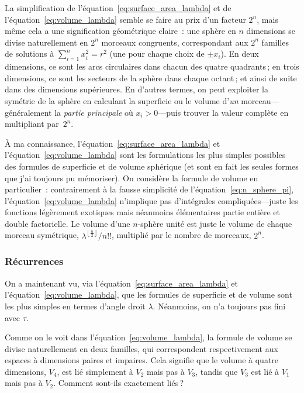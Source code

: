La simplification de l'équation~\eqref{eq:surface_area_lambda} et de l'équation~\eqref{eq:volume_lambda} semble se faire au prix d'un facteur $2^n$, mais même cela a une signification géométrique claire~: une sphère en $n$ dimensions se divise naturellement en $2^n$ morceaux congruents, correspondant aux $2^n$ familles de solutions à $\sum_{i=1}^{n} x_i^2 = r^2$ (une pour chaque choix de $\pm x_i$). En deux dimensions, ce sont les arcs circulaires dans chacun des quatre quadrants\,; en trois dimensions, ce sont les secteurs de la sphère dans chaque octant\,; et ainsi de suite dans des dimensions supérieures. En d'autres termes, on peut exploiter la symétrie de la sphère en calculant la superficie ou le volume d'\emph{un} morceau---généralement la \emph{partie principale} où $x_i > 0$---puis trouver la valeur complète en multipliant par~$2^n$.

À ma connaissance, l'équation~\eqref{eq:surface_area_lambda} et l'équation~\eqref{eq:volume_lambda} sont les formulations les plus simples possibles des formules de superficie et de volume sphérique (et sont en fait les seules formes que j'ai toujours pu mémoriser). On considère la formule de volume en particulier~: contrairement à la fausse simplicité de l'équation~\eqref{eq:n_sphere_pi}, l'équation~\eqref{eq:volume_lambda} n'implique pas d'intégrales compliquées---juste les fonctions légèrement exotiques mais néanmoins élémentaires partie entière et double factorielle. Le volume d'une $n$-sphère unité est juste le volume de chaque morceau symétrique, $\lambda^{\left\lfloor \frac{n}{2} \right\rfloor}/n!!$, multiplié par le nombre de morceaux, $2^n$.


\subsubsection{Récurrences} %
\label{sec:recurrences}

On a maintenant vu, via l'équation~\eqref{eq:surface_area_lambda} et l'équation~\eqref{eq:volume_lambda}, que les formules de superficie et de volume sont les plus simples en termes d'angle droit $\lambda$. Néanmoins, on n'a toujours pas fini avec $\tau$.

Comme on le voit dans l'équation~\eqref{eq:volume_lambda}, la formule de volume se divise naturellement en deux familles, qui correspondent respectivement aux espaces à dimensions paires et impaires. Cela signifie que le volume à quatre dimensions, $V_4$, est lié simplement à $V_2$ mais pas à $V_3$, tandis que $V_3$ est lié à $V_1$ mais pas à $V_2$. Comment sont-ils exactement liés\,?

